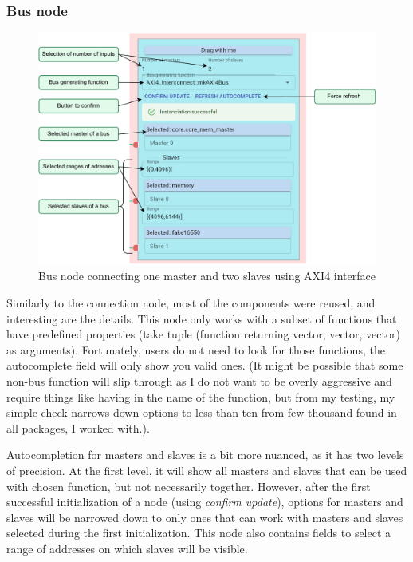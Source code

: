 \documentclass[12pt]{report}
\begin{document}
\subsubsection{Bus node}
\label{sec:AutocompletionBusNode}
\begin{figure}[!h]
\centering
\includegraphics[width=1\columnwidth]{pdfExports/LargeMap-BusNode.drawio.pdf}
\caption{Bus node connecting one master and two slaves using AXI4 interface}
\end{figure}

Similarly to the connection node, most of the components were reused, and interesting are the details. This node only works with a subset of functions that have predefined properties (take tuple (function returning vector, vector, vector) as arguments). Fortunately, users do not need to look for those functions, the autocomplete field will only show you valid ones. (It might be possible that some non-bus function will slip through as I do not want to be overly aggressive and require things like having  in the name of the function, but from my testing, my simple check narrows down options to less than ten from few thousand found in all packages, I worked with.).

Autocompletion for masters and slaves is a bit more nuanced, as it has two levels of precision. At the first level, it will show all masters and slaves that can be used with chosen function, but not necessarily together. However, after the first successful initialization of a node (using \emph{confirm update}), options for masters and slaves will be narrowed down to only ones that can work with masters and slaves selected during the first initialization.
This node also contains fields to select a range of addresses on which slaves will be visible. 
\newpage
\end{document}
